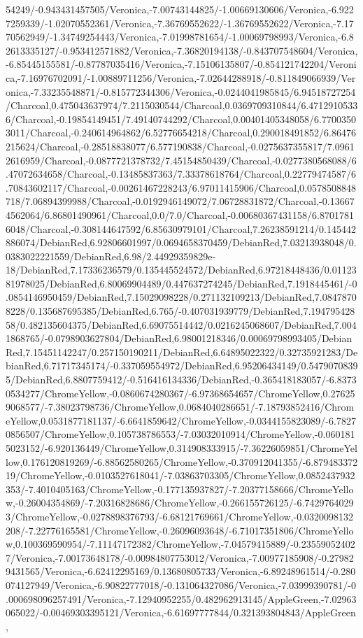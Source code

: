 {\begin{tikzternal}
54249/-0.943431457505/Veronica,-7.00743144825/-1.00669130606/Veronica,-6.9227259339/-1.02070552361/Veronica,-7.36769552622/-1.36769552622/Veronica,-7.1770562949/-1.34749254443/Veronica,-7.01998781654/-1.00069798993/Veronica,-6.82613335127/-0.953412571882/Veronica,-7.36820194138/-0.843707548604/Veronica,-6.85445155581/-0.87787035416/Veronica,-7.15106135807/-0.854121742204/Veronica,-7.16976702091/-1.00889711256/Veronica,-7.02644288918/-0.811849066939/Veronica,-7.33235548871/-0.815772344306/Veronica,-0.0244041985845/6.94518727254/Charcoal,0.475043637974/7.2115030544/Charcoal,0.0369709310844/6.47129105336/Charcoal,-0.19854149451/7.49140744292/Charcoal,0.00401405348058/6.77003503011/Charcoal,-0.240614964862/6.52776654218/Charcoal,0.290018491852/6.86476215624/Charcoal,-0.28518838077/6.577190838/Charcoal,-0.0275637355817/7.09612616959/Charcoal,-0.0877721378732/7.45154850439/Charcoal,-0.0277380568088/6.47072634658/Charcoal,-0.13485837363/7.33378618764/Charcoal,0.22779474587/6.70843602117/Charcoal,-0.00261467228243/6.97011415906/Charcoal,0.0578508848718/7.06894399988/Charcoal,-0.0192946149072/7.06728831872/Charcoal,-0.136674562064/6.86801490961/Charcoal,0.0/7.0/Charcoal,-0.00680367431158/6.87017816048/Charcoal,-0.308144647592/6.85630979101/Charcoal,7.26238591214/0.145442886074/DebianRed,6.92806601997/0.0694658370459/DebianRed,7.03213938048/0.0383022221559/DebianRed,6.98/2.44929359829e-18/DebianRed,7.17336236579/0.135445524572/DebianRed,6.97218448436/0.0112381978025/DebianRed,6.80069904489/0.447637274245/DebianRed,7.1918445461/-0.0854146950459/DebianRed,7.15029098228/0.271132109213/DebianRed,7.08478708228/0.135687695385/DebianRed,6.765/-0.407031939779/DebianRed,7.19479542858/0.482135604375/DebianRed,6.69075514442/0.0216245068607/DebianRed,7.0041868765/-0.0798903627804/DebianRed,6.98001218346/0.00069798993405/DebianRed,7.15451142247/0.257150190211/DebianRed,6.64895022322/0.32735921283/DebianRed,6.71717345174/-0.337059554972/DebianRed,6.95206434149/0.54790708395/DebianRed,6.8807759412/-0.516416134336/DebianRed,-0.365418183057/-6.83730534277/ChromeYellow,-0.0860674280367/-6.97368654657/ChromeYellow,0.276259068577/-7.38023798736/ChromeYellow,0.0684040286651/-7.18793852416/ChromeYellow,0.0531877181137/-6.6641859642/ChromeYellow,-0.0344155823089/-6.78270856507/ChromeYellow,0.105738786553/-7.03032010914/ChromeYellow,-0.0601815023152/-6.920136449/ChromeYellow,0.314908333915/-7.36226059851/ChromeYellow,0.176120819269/-6.88562580265/ChromeYellow,-0.370912041355/-6.87948337219/ChromeYellow,-0.0103527618041/-7.03863703305/ChromeYellow,0.0852437932353/-7.4010405163/ChromeYellow,-0.177135937827/-7.20377158666/ChromeYellow,-0.26004354869/-7.20316828686/ChromeYellow,-0.266155726125/-6.74297640293/ChromeYellow,-0.0278898376793/-6.68121769661/ChromeYellow,-0.0320098132208/-7.22776165581/ChromeYellow,-0.26096093648/-6.71017351806/ChromeYellow,0.100369590954/-7.11147172382/ChromeYellow,-7.04579415889/-0.235590524027/Veronica,-7.00173648178/-0.00984807753012/Veronica,-7.00977185908/-0.279829431565/Veronica,-6.62412295169/0.13680805733/Veronica,-6.89248961514/-0.280074127949/Veronica,-6.90822777018/-0.131064327086/Veronica,-7.03999390781/-0.000698096257491/Veronica,-7.12940952255/0.482962913145/AppleGreen,-7.02963065022/-0.00469303395121/Veronica,-6.61697777844/0.321393804843/AppleGreen,
\end{tikzternal}}
